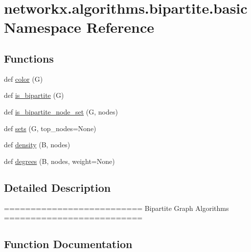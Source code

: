 \hypertarget{namespacenetworkx_1_1algorithms_1_1bipartite_1_1basic}{}\section{networkx.\+algorithms.\+bipartite.\+basic Namespace Reference}
\label{namespacenetworkx_1_1algorithms_1_1bipartite_1_1basic}
\subsection*{Functions}
\begin{DoxyCompactItemize}
\item 
def \hyperlink{namespacenetworkx_1_1algorithms_1_1bipartite_1_1basic_a6462e071381cc74c249460b049be721c}{color} (G)
\item 
def \hyperlink{namespacenetworkx_1_1algorithms_1_1bipartite_1_1basic_ae7270bffa6310b169dab29de12670980}{is\+\_\+bipartite} (G)
\item 
def \hyperlink{namespacenetworkx_1_1algorithms_1_1bipartite_1_1basic_ae6daf4a71e3df41c92b02c3004441681}{is\+\_\+bipartite\+\_\+node\+\_\+set} (G, nodes)
\item 
def \hyperlink{namespacenetworkx_1_1algorithms_1_1bipartite_1_1basic_aacbc287cbc9094e5b488d5e3791cc964}{sets} (G, top\+\_\+nodes=None)
\item 
def \hyperlink{namespacenetworkx_1_1algorithms_1_1bipartite_1_1basic_a6f01281cb4f0d12041cfef9cbfc4bbb4}{density} (B, nodes)
\item 
def \hyperlink{namespacenetworkx_1_1algorithms_1_1bipartite_1_1basic_a3f81ac1d3e9ad819f508fb97ce748830}{degrees} (B, nodes, weight=None)
\end{DoxyCompactItemize}


\subsection{Detailed Description}
\begin{DoxyVerb}==========================
Bipartite Graph Algorithms
==========================
\end{DoxyVerb}
 

\subsection{Function Documentation}
\mbox{\label{namespacenetworkx_1_1algorithms_1_1bipartite_1_1basic_a6462e071381cc74c249460b049be721c}} 
